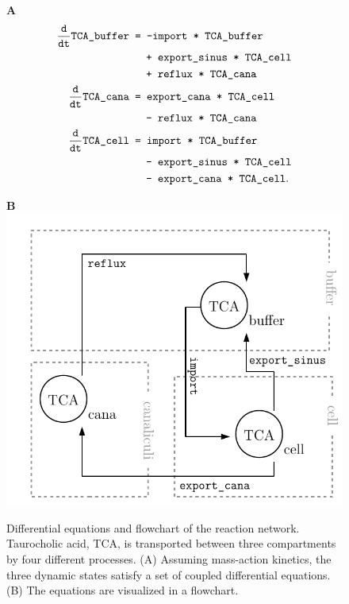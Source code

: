 \documentclass[article]{jss}
\begin{document}
\begin{figure}[t!]
\centering
\begin{minipage}{0.55\textwidth}
\textbf{A}
\begin{equation*}
\begin{aligned}
\frac{\texttt d}{ \texttt{dt} } \verb!TCA_buffer! &\texttt{ = } \verb!-import * TCA_buffer!\\
& \quad \verb! + export_sinus * TCA_cell!\\
& \quad \verb! + reflux * TCA_cana!\\
\frac{\texttt d}{ \texttt{dt}} \verb!TCA_cana! &\texttt{ = } \verb!export_cana * TCA_cell!\\
& \quad \verb! - reflux * TCA_cana!\\
\frac{\texttt d}{ \texttt{dt}} \verb!TCA_cell! &\texttt{ = } \verb!import * TCA_buffer!\\
& \quad \verb! - export_sinus * TCA_cell!\\
&\quad \verb! - export_cana * TCA_cell!.
\end{aligned}
\end{equation*}
\end{minipage}
\begin{minipage}{0.44\textwidth}
\textbf{B}\\
\includegraphics[width = \textwidth]{Figures/flowchart}
\end{minipage}
\caption{Differential equations and flowchart of the reaction network. Taurocholic acid,  TCA, is transported between three compartments by four different processes. (A) Assuming mass-action kinetics, the three dynamic states satisfy a set of coupled differential equations. (B) The equations are visualized in a flowchart. }
\label{fig:flowchart}
\end{figure}
\end{document}

